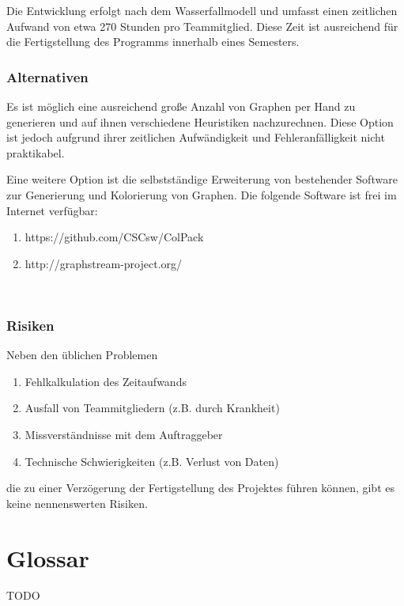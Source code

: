 \documentclass{article}
\begin{document}
	Die Entwicklung erfolgt nach dem Wasserfallmodell und umfasst einen zeitlichen Aufwand von etwa 270 Stunden pro Teammitglied. Diese Zeit ist ausreichend für die Fertigstellung des Programms innerhalb eines Semesters.
	
	
	\subsubsection{Alternativen}
	Es ist möglich eine ausreichend große Anzahl von Graphen per Hand zu generieren und auf ihnen verschiedene Heuristiken nachzurechnen. Diese Option ist jedoch aufgrund ihrer zeitlichen Aufwändigkeit und Fehleranfälligkeit nicht praktikabel.
	
	Eine weitere Option ist die selbstständige Erweiterung von bestehender Software zur Generierung und Kolorierung von Graphen. Die folgende Software ist frei im Internet verfügbar:
	\begin{enumerate}[--]
		\item{https://github.com/CSCsw/ColPack}
		\item{http://graphstream-project.org/}
	\end{enumerate}
	
	~\newpage
	\subsubsection{Risiken}
	Neben den üblichen Problemen
	\begin{enumerate}[--]
		\item{Fehlkalkulation des Zeitaufwands}
		\item{Ausfall von Teammitgliedern (z.B. durch Krankheit)}
		\item{Missverständnisse mit dem Auftraggeber}
		\item{Technische Schwierigkeiten (z.B. Verlust von Daten)}
	\end{enumerate}
	die zu einer Verzögerung der Fertigstellung des Projektes führen können, gibt es keine nennenswerten Risiken.
	
	\section{Glossar}
	
	TODO
	
	\glsaddall
	\printglossaries
\end{document}
